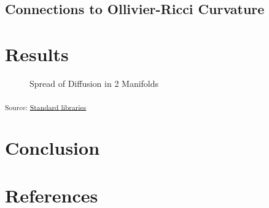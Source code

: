 \documentclass[
]{agujournal2019}
\newlength{\cslhangindent}
\newenvironment{CSLReferences}[2] %
 {\begin{list}{}{%
  \setlength{\itemindent}{0pt}
  \setlength{\leftmargin}{0pt}
  \setlength{\parsep}{0pt}
  \ifodd #1
   \setlength{\leftmargin}{\cslhangindent}
   \setlength{\itemindent}{-1\cslhangindent}
  \fi
  \setlength{\itemsep}{#2\baselineskip}}}
 {\end{list}}
\begin{document}
\subsection{Connections to Ollivier-Ricci
Curvature}\label{connections-to-ollivier-ricci-curvature}

\section{Results}\label{results}

\begin{figure}[H]


\caption{\label{fig-spread-of-diffusion-2d}Spread of Diffusion in 2
Manifolds}

\end{figure}%

\textsubscript{Source:
\href{https://professorwug.github.io/diffusion-curvature//Users/boreas/Pumberton/Workshop/21-SUMRY-Curvature/diffusion-curvature/nbs/experiments/2c3-are-kernels-zeitgeibers.ipynb.html\#cell-fig-spread-of-diffusion-2d}{Standard
libraries}}

\section{Conclusion}\label{conclusion}

\section*{References}\label{references}

\label{refs}
\begin{CSLReferences}{0}{1}
\vspace{1em}

\end{CSLReferences}
\end{document}
